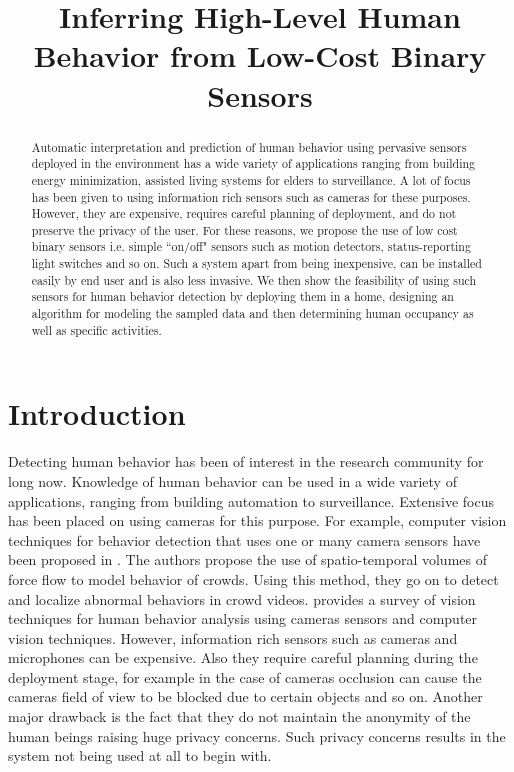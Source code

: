 \documentclass[10pt, conference, compsocconf]{IEEEtran}
\begin{document}
\title{Inferring High-Level Human Behavior 
from Low-Cost Binary Sensors 
}

\author{

}

\maketitle

\begin{abstract}
Automatic interpretation and prediction of human behavior using pervasive sensors deployed in the environment has a wide variety of applications ranging from building energy minimization, assisted living systems for elders to surveillance. A lot of focus has been given to using information rich sensors such as cameras for these purposes. However, they are expensive, requires careful planning of deployment, and do not preserve the privacy of the user. For these reasons, we propose the use of low cost binary sensors i.e. simple ``on/off" sensors such as motion detectors, status-reporting light switches and so on. Such a system apart from being inexpensive, can be installed easily by end user and is also less invasive. We then show the feasibility of using such sensors for human behavior detection by deploying them in a home, designing an algorithm for modeling the sampled data and then determining human occupancy as well as specific activities. 
\end{abstract}


\section{Introduction}

Detecting human behavior has been of interest in the research community for long now. Knowledge of human behavior can be used in a wide variety of applications, ranging from building automation to surveillance. 
Extensive focus has been placed on using cameras for this purpose. For example, computer vision techniques for behavior detection that uses one or many camera sensors have been proposed in \cite{1}. The authors propose the use of spatio-temporal volumes of force flow to model behavior of crowds. Using this method, they go on to detect and localize abnormal behaviors in crowd videos. \cite{2} provides a survey of vision techniques for human behavior analysis using cameras sensors and computer vision techniques. However, information rich sensors such as cameras and microphones can be expensive. Also they require careful planning during the deployment stage, for example in the case of cameras occlusion can cause the cameras field of view to be blocked due to certain objects and so on. Another major drawback is the fact that they do not maintain the anonymity of the human beings raising huge privacy concerns. Such privacy concerns results in the system not being used at all to begin with.
\end{document}
